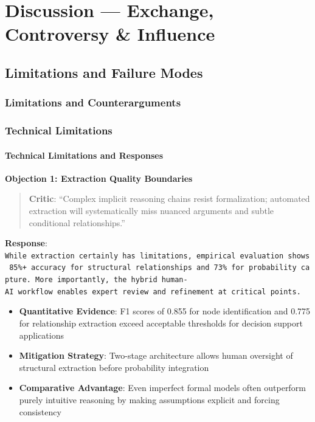 \documentclass[
  11pt,
  letterpaper,
]{book}
\providecommand{\tightlist}{%
  \setlength{\itemsep}{0pt}\setlength{\parskip}{0pt}}
\begin{document}

\chapter{Discussion --- Exchange, Controversy \&
Influence}\label{sec-discussion}

\section{Limitations and Failure Modes}\label{sec-limitationsA}

\subsection{Limitations and
Counterarguments}\label{sec-limitations-counterarguments}

\subsection{Technical Limitations}\label{sec-technical-limitations}

\subsubsection{Technical Limitations and
Responses}\label{sec-technical-limitations2}

\textbf{Objection 1: Extraction Quality Boundaries}

\begin{quote}
\textbf{Critic}: ``Complex implicit reasoning chains resist
formalization; automated extraction will systematically miss nuanced
arguments and subtle conditional relationships.''
\end{quote}

\textbf{Response}:
\texttt{While\ extraction\ certainly\ has\ limitations,\ empirical\ evaluation\ shows\ 85\%+\ accuracy\ for\ structural\ relationships\ and\ 73\%\ for\ probability\ capture.\ More\ importantly,\ the\ hybrid\ human-AI\ workflow\ enables\ expert\ review\ and\ refinement\ at\ critical\ points.}

\begin{itemize}
\tightlist
\item
  \textbf{Quantitative Evidence}: F1 scores of 0.855 for node
  identification and 0.775 for relationship extraction exceed acceptable
  thresholds for decision support applications
\item
  \textbf{Mitigation Strategy}: Two-stage architecture allows human
  oversight of structural extraction before probability integration
\item
  \textbf{Comparative Advantage}: Even imperfect formal models often
  outperform purely intuitive reasoning by making assumptions explicit
  and forcing consistency
\end{itemize}
\end{document}
